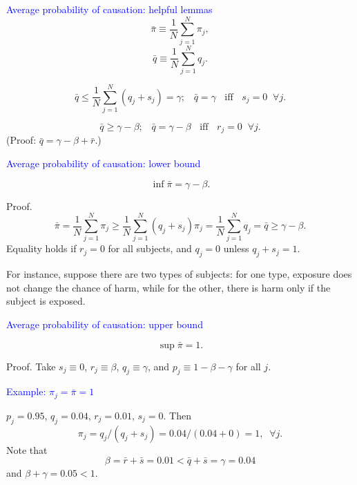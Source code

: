 \documentclass[landscape]{slides}
\newcommand{\beq}{\begin{equation}}
\newcommand{\eeq}{\end{equation}}
\begin{document}
\begin{slide}
\begin{slide}{\textcolor{blue}{Average probability of causation: helpful lemmas}}
\beq
   \bar{\pi} \equiv \frac{1}{N} \sum_{j=1}^N \pi_j,
\eeq
\beq
    \bar{q} \equiv \frac{1}{N} \sum_{j=1}^N q_j.
\eeq

\beq \label{eq:qBarUpper}
   \bar{q} \le \frac{1}{N} \sum_{j=1}^N (q_j + s_j) = \gamma; \;\;\; 
    \bar{q} = \gamma \;\; \mbox{ iff } \;\; s_j = 0 \;\;\forall j.
\eeq

\beq \label{eq:qBarLower}
   \bar{q} \ge \gamma - \beta; \;\;\;
        \bar{q} = \gamma-\beta \;\; \mbox{ iff } \;\; r_j = 0 \;\; \forall j.
\eeq
(Proof: $\bar{q} = \gamma - \beta + \bar{r}$.)

\end{slide}

\begin{slide}{\textcolor{blue}{Average probability of causation: lower bound}}

\beq
   \inf \bar{\pi}  = \gamma - \beta.
\eeq

Proof.
\beq
   \bar{\pi} = \frac{1}{N} \sum_{j=1}^N \pi_j 
    \ge \frac{1}{N} \sum_{j=1}^N (q_j + s_j) \pi_j
   = \frac{1}{N} \sum_{j=1}^N q_j
   = \bar{q} 
   \ge \gamma - \beta.
\eeq
Equality holds if $r_j = 0$ for all subjects, and
$q_j = 0$ unless $q_j + s_j = 1$.

For instance, suppose there are two types of subjects: for
one type, exposure does not change the chance of harm,
while for the other, there is harm only if the subject is exposed.
\end{slide}


\begin{slide}{\textcolor{blue}{Average probability of causation: upper bound}}

\beq
   \sup \bar{\pi}  = 1.
\eeq

Proof.
Take $s_j \equiv 0$, $r_j \equiv \beta$, $q_j \equiv \gamma$, and
$p_j \equiv 1 - \beta - \gamma$ for all $j$.

\end{slide}

\begin{slide}{\textcolor{blue}{Example:  $\pi_j = \bar{\pi} = 1$}}

$p_j = 0.95$, $q_j = 0.04$, $r_j = 0.01$, $s_j = 0$.
Then 
\beq
    \pi_j = q_j/(q_j + s_j) =  0.04/(0.04 + 0) = 1, \;\; \forall j.
\eeq
Note that 
\beq
    \beta = \bar{r} + \bar{s} = 0.01 < \bar{q} + \bar{s}  = \gamma = 0.04
\eeq
and $\beta + \gamma = 0.05 < 1$.
\end{slide}


\end{slide}
\end{document}
